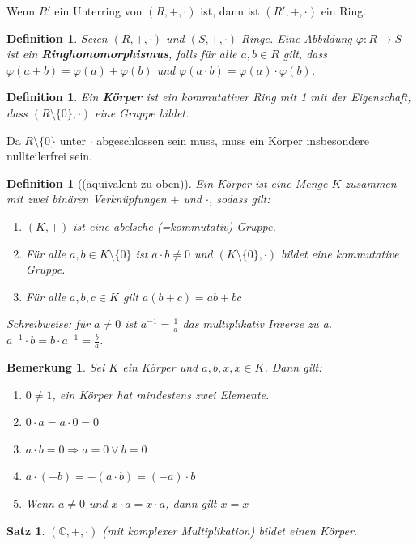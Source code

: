 \documentclass[12pt,a4paper]{article}
\theoremstyle{plain}
\newtheorem{Satz}[Theorem]{Satz}
\newtheorem{Definition}[Theorem]{Definition}
\newtheorem{Bemerkung}[Theorem]{Bemerkung}
\newcommand{\herv}[1]{{\emph{\textbf{#1}}}}
\newcommand{\C}{\mathbb{C}}
\numberwithin{equation}{section}
\begin{document}
Wenn $R'$ ein Unterring von $(R,+,\cdot)$ ist, dann ist $(R',+,\cdot)$ ein Ring.
\begin{Definition}
Seien $(R,+,\cdot)$ und $(S,+,\cdot)$ Ringe. Eine Abbildung $\varphi: R\rightarrow S$ ist ein \herv{Ringhomomorphismus}, falls für alle $a,b\in R$ gilt, dass $\varphi(a+b)=\varphi(a)+\varphi(b)$ und $\varphi(a\cdot b)=\varphi(a)\cdot \varphi(b)$.
\end{Definition}
\begin{Definition}
Ein \herv{Körper} ist ein kommutativer Ring mit 1 mit der Eigenschaft, dass $(R\setminus\{0\},\cdot)$ eine Gruppe bildet.
\end{Definition}
Da $R\setminus\{0\}$ unter $\cdot$ abgeschlossen sein muss, muss ein Körper insbesondere nullteilerfrei sein.
\begin{Definition}[(äquivalent zu oben)]
Ein Körper ist eine Menge $K$ zusammen mit zwei binären Verknüpfungen $+$ und $\cdot$, sodass gilt:
\begin{enumerate}
\renewcommand{\labelenumi}{\emph{(K\arabic{enumi})}}
\item $(K,+)$ ist eine abelsche (=kommutativ) Gruppe.
\item Für alle $a,b\in K\setminus\{0\}$ ist $a\cdot b\neq 0$ und $(K\setminus\{0\},\cdot)$ bildet eine kommutative Gruppe.
\item Für alle $a,b,c\in K$ gilt $a(b+c)=ab+bc$
\end{enumerate}
Schreibweise: für $a\neq 0$ ist $a^{-1}=\frac{1}{a}$ das multiplikativ Inverse zu a. $a^{-1}\cdot b=b\cdot a^{-1}=\frac{b}{a}$.
\end{Definition}
\begin{Bemerkung}
Sei $K$ ein Körper und $a,b,x,\tilde{x}\in K$. Dann gilt:
\begin{enumerate}
\renewcommand{\labelenumi}{(\alph{enumi})}
\item $0\neq 1$, ein Körper hat mindestens zwei Elemente.
\item $0\cdot a=a\cdot 0=0$
\item $a\cdot b=0 \Rightarrow a=0 \vee b=0$
\item $a\cdot (-b)=-(a\cdot b)=(-a)\cdot b$
\item Wenn $a\neq 0$ und $x\cdot a=\tilde{x}\cdot a$, dann gilt $x=\tilde{x}$
\end{enumerate}
\end{Bemerkung}
\begin{Satz}
$(\C,+,\cdot)$ (mit komplexer Multiplikation) bildet einen Körper.
\end{Satz}
\end{document}
